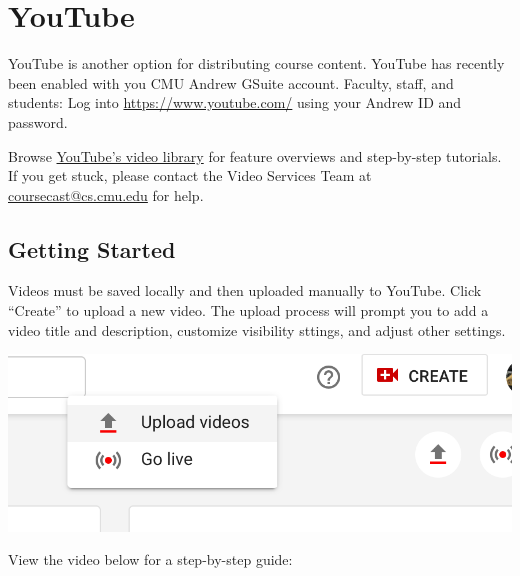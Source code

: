 \chapter{YouTube}
\label{ch:youtube}

\begin{gram}[Introduction]
\label{grm:youtube:introduction}
    YouTube is another option for distributing course content.
    YouTube has recently been enabled with you CMU Andrew GSuite account.
    Faculty, staff, and students: Log into \href{https://www.youtuube.com/}{https://www.youtube.com/} using your Andrew ID and password.

    \begin{note}
        Browse \href{https://www.youtube.com/user/youtubehelp?sub_confirmation=1}{YouTube's video library} for feature overviews and step-by-step tutorials.
        If you get stuck, please contact the Video Services Team at \href{mailto:coursecast@cs.cmu.edu}{coursecast@cs.cmu.edu} for help.
    \end{note}

\end{gram}


\section{Getting Started}
\label{sec:youtube:getting_started}

\begin{gram}
    Videos must be saved locally and then uploaded manually to YouTube.
    Click ``Create'' to upload a new video.
    The upload process will prompt you to add a video title and description, customize visibility sttings, and adjust other settings.

    {
        \centering
        \includegraphics[scale=0.4]{youtube/media/08-youtube-upload.png}
    }
\end{gram}

View the video below for a step-by-step guide:

